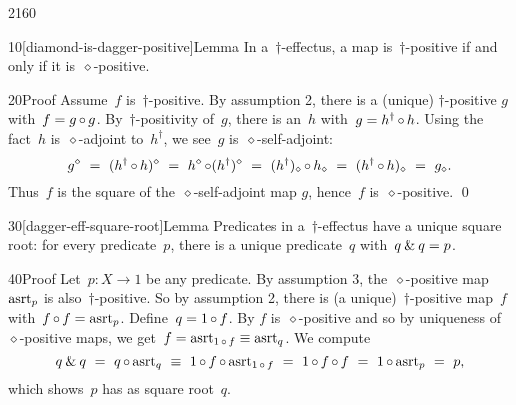 \begin{parsec}{2160}%
\begin{point}{10}[diamond-is-dagger-positive]{Lemma}%
In a~$\dagger$-effectus,
    a map is~$\dagger$-positive if and only if it is~$\diamond$-positive.
\begin{point}{20}{Proof}%
Assume~$f$ is~$\dagger$-positive.
By assumption 2, there is a (unique) $\dagger$-positive
    $g$ with~$f = g \mathop{\circ} g$.
By~$\dagger$-positivity of~$g$,
    there is an~$h$ with~$g = h^\dagger \mathop{\circ} h$.
Using the fact~$h$ is~$\diamond$-adjoint
    to~$h^\dagger$, we see~$g$ is~$\diamond$-self-adjoint:
\begin{equation*}
    g^\diamond
    \ =\  (h^\dagger \mathop{\circ} h)^\diamond
    \ =\  h^\diamond \mathop{\circ} (h^\dagger)^\diamond 
    \ =\  (h^\dagger)_\diamond \mathop{\circ} h_\diamond 
    \ =\  (h^\dagger\mathop{\circ} h)_\diamond
    \ =\  g_\diamond.
\end{equation*}
Thus~$f$ is the square of the~$\diamond$-self-adjoint map $g$,
    hence~$f$ is~$\diamond$-positive. \qed
\end{point}
\end{point}

\begin{point}{30}[dagger-eff-square-root]{Lemma}%
Predicates in a~$\dagger$-effectus have a unique square root:
    for every predicate~$p$,
    there is a unique predicate~$q$
    with~$q \mathbin{\&} q=p$.
\begin{point}{40}{Proof}%
Let~$p\colon X \to 1$ be any predicate.
By assumption 3,
    the~$\diamond$-positive map~$\mathrm{asrt}_p$
        is also~$\dagger$-positive.
So by assumption 2,
    there is (a unique)~$\dagger$-positive map~$f$
    with~$f \mathop{\circ} f = \mathrm{asrt}_p$.
Define~$q = 1 \mathop{\circ} f$.
By 
    $f$ is~$\diamond$-positive
    and so by uniqueness of~$\diamond$-positive maps,
    we get~$f = \mathrm{asrt}_{1\mathop{\circ} f} \equiv \mathrm{asrt}_q$.
We compute
\begin{equation*}
    \andthen{q}{q}
        \ =\    
        q \after \asrt_q \ \equiv \ 
        1 \after f \after \asrt_{1 \after f} \ = \ 
        1 \after f \after f \ = \ 1 \after \asrt_p \ = \ p,
\end{equation*}
which shows~$p$ has as square root~$q$.


\end{point}
\end{point}
\end{parsec}
